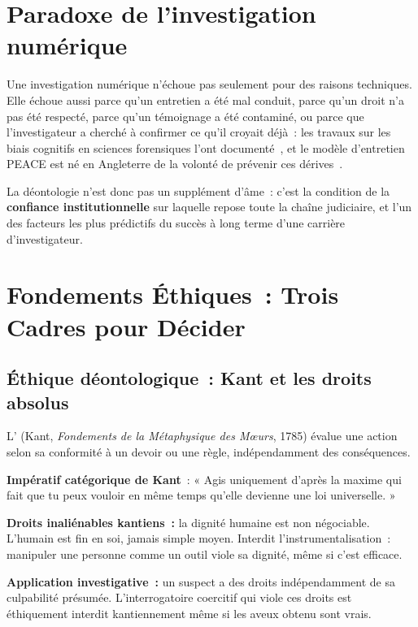 \section*{Paradoxe de l'investigation numérique}

Une investigation numérique n'échoue pas seulement pour des raisons
techniques. Elle échoue aussi parce qu'un entretien a été mal conduit, parce
qu'un droit n'a pas été respecté, parce qu'un témoignage a été contaminé, ou
parce que l'investigateur a cherché à confirmer ce qu'il croyait déjà~:
les travaux sur les biais cognitifs en sciences forensiques l'ont
documenté~\cite{dror2020cognitive}, et le modèle d'entretien PEACE est né
en Angleterre de la volonté de prévenir ces dérives~\cite{milne1999investigative}.

La déontologie n'est donc pas un supplément d'âme~: c'est la condition
de la \textbf{confiance institutionnelle} sur laquelle repose toute
la chaîne judiciaire, et l'un des facteurs les plus prédictifs du
succès à long terme d'une carrière d'investigateur.

\separateur

\section{Fondements Éthiques~: Trois Cadres pour Décider}
\label{sec:fondements-ethiques}

\subsection{Éthique déontologique~: Kant et les droits absolus}

L' (Kant,
\textit{Fondements de la Métaphysique des M\oe urs}, 1785) évalue une
action selon sa conformité à un devoir ou une règle, indépendamment
des conséquences.

\begin{boxdef}
\textbf{Impératif catégorique de Kant}~: « Agis uniquement d'après
la maxime qui fait que tu peux vouloir en même temps qu'elle devienne
une loi universelle. »

\textbf{Droits inaliénables kantiens~:} la dignité humaine est non
négociable. L'humain est fin en soi, jamais simple moyen. Interdit
l'instrumentalisation~: manipuler une personne comme un outil viole
sa dignité, même si c'est efficace.

\textbf{Application investigative~:} un suspect a des droits indépendamment
de sa culpabilité présumée. L'interrogatoire coercitif qui viole ces
droits est éthiquement interdit kantiennement même si les aveux
obtenu sont vrais.
\end{boxdef}

